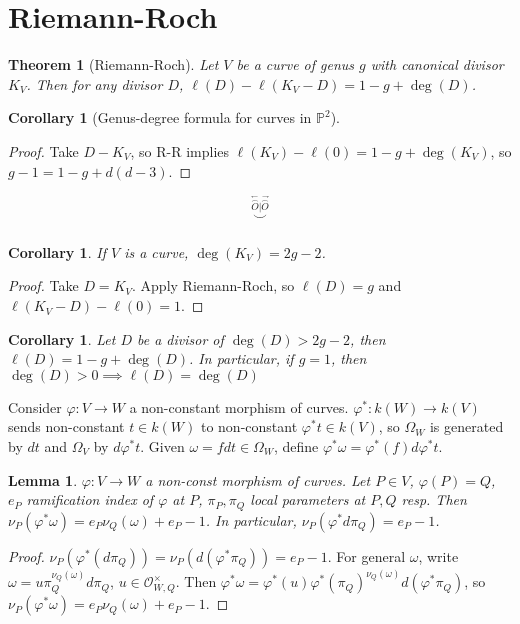 \documentclass{article}
\theoremstyle{definition}
\theoremstyle{remark}
\theoremstyle{plain}
\newtheorem{lem}[defn]{Lemma}
\newtheorem{thm}[defn]{Theorem}
\newtheorem{crly}[defn]{Corollary}
\newcommand{\PP}{\mathbb{P}}
\begin{document}
\section{Riemann-Roch}
\begin{thm}[Riemann-Roch]
    Let $V$ be a curve of genus $g$ with canonical divisor $K_V$. Then for any divisor $D$, $\ell(D)-\ell(K_V-D)=1-g+\deg(D)$.
\end{thm}
\begin{crly}[Genus-degree formula for curves in $\PP^2$]\end{crly}
\begin{proof}
    Take $D-K_V$, so R-R implies $\ell(K_V)-\ell(0)=1-g+\deg(K_V)$, so $g-1=1-g+d(d-3)$. 
\end{proof}
\[\overset{\overset{\leftharpoondown\rightharpoondown}{\overset{\smallfrown}{O}\vert\overset{\smallfrown}{O}}}{\smile}\tag{Owen's signature}\]
\begin{crly}
    If $V$ is a curve, $\deg(K_V)=2g-2$.
\end{crly}
\begin{proof}
    Take $D=K_V$. Apply Riemann-Roch, so $\ell(D)=g$ and $\ell(K_V-D)-\ell(0)=1$.
\end{proof}
\begin{crly}
    Let $D$ be a divisor of $\deg(D)>2g-2$, then $\ell(D)=1-g+\deg(D)$. In particular, if $g=1$, then $\deg(D)>0\implies \ell(D)=\deg(D)$
\end{crly}
Consider $\varphi:V\to W$ a non-constant morphism of curves. $\varphi^\ast:k(W)\to k(V)$ sends non-constant $t\in k(W)$ to non-constant $\varphi^\ast t\in k(V)$, so $\Omega_W$ is generated by $dt$ and $\Omega_V$ by $d\varphi^\ast t$. Given $\omega=fdt\in\Omega_W$, define $\varphi^\ast\omega=\varphi^\ast(f)d\varphi^\ast t$.
\begin{lem}
    $\varphi:V\to W$ a non-const morphism of curves. Let $P\in V$, $\varphi(P)=Q$, $e_P$ ramification index of $\varphi$ at $P$, $\pi_P,\pi_Q$ local parameters at $P,Q$ resp. Then $\nu_P(\varphi^\ast\omega)=e_P\nu_Q(\omega)+e_P-1$. In particular, $\nu_P(\varphi^\ast d\pi_Q)=e_P-1$.
\end{lem}
\begin{proof}
    $\nu_P(\varphi^\ast(d\pi_Q))=\nu_P(d(\varphi^\ast\pi_Q))=e_P-1$. For general $\omega$, write $\omega=u\pi_Q^{\nu_Q(\omega)}d\pi_Q$, $u\in\mathcal O_{W,Q}^\times$. Then $\varphi^\ast\omega=\varphi^\ast(u)\varphi^\ast(\pi_Q)^{\nu_Q(\omega)}d(\varphi^\ast\pi_Q)$, so $\nu_P(\varphi^\ast\omega)=e_P\nu_Q(\omega)+e_P-1$.
\end{proof}
\end{document}
